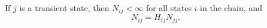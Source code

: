If $j$ is a transient state, then $N_{ij} < \infty$ for all states $i$ in the chain, and
$$N_{ij} = H_{ij}N_{jj}.$$
